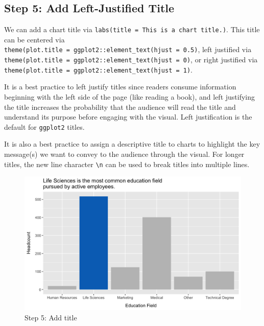 \documentclass[
]{book}
\begin{document}
\hypertarget{step-5-add-left-justified-title}{%
\subsection{Step 5: Add Left-Justified Title}\label{step-5-add-left-justified-title}}

We can add a chart title via \texttt{labs(title\ =\ \textquotesingle{}This\ is\ a\ chart\ title.\textquotesingle{})}. This title can be centered via \texttt{theme(plot.title\ =\ ggplot2::element\_text(hjust\ =\ 0.5)}, left justified via \texttt{theme(plot.title\ =\ ggplot2::element\_text(hjust\ =\ 0)}, or right justified via \texttt{theme(plot.title\ =\ ggplot2::element\_text(hjust\ =\ 1)}.

It is a best practice to left justify titles since readers consume information beginning with the left side of the page (like reading a book), and left justifying the title increases the probability that the audience will read the title and understand its purpose before engaging with the visual. Left justification is the default for \texttt{ggplot2} titles.

It is also a best practice to assign a descriptive title to charts to highlight the key message(s) we want to convey to the audience through the visual. For longer titles, the new line character \texttt{\textbackslash{}n} can be used to break titles into multiple lines.

\begin{figure}

{\centering \includegraphics[width=1\linewidth]{graphics/viz_step_5} 

}

\caption{Step 5: Add title}\label{fig:barchart-5}
\end{figure}
\end{document}

